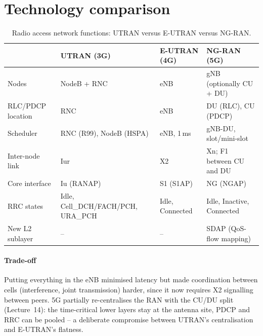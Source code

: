 \documentclass[11pt,a4paper]{article}
\begin{document}
\section{Technology comparison}
\begin{table}[htbp]
\centering\small
\caption{Radio access network functions: UTRAN versus E-UTRAN versus NG-RAN.}\label{tab:ran}
\begin{tabularx}{\linewidth}{@{}l Y Y Y@{}}
\toprule
{} & UTRAN (3G) & E-UTRAN (4G) & NG-RAN (5G) \\
\midrule
Nodes              & NodeB + RNC          & eNB                       & gNB (optionally CU + DU) \\
RLC/PDCP location  & RNC                  & eNB                       & DU (RLC), CU (PDCP) \\
Scheduler          & RNC (R99), NodeB (HSPA) & eNB, 1\,ms             & gNB-DU, slot/mini-slot \\
Inter-node link    & Iur                  & X2                        & Xn; F1 between CU and DU \\
Core interface     & Iu (RANAP)           & S1 (S1AP)                 & NG (NGAP) \\
RRC states         & Idle, Cell\_DCH/FACH/PCH, URA\_PCH & Idle, Connected & Idle, Inactive, Connected \\
New L2 sublayer    & --                   & --                        & SDAP (QoS-flow mapping) \\
\bottomrule
\end{tabularx}
\end{table}

\paragraph{Trade-off} Putting everything in the eNB minimised latency but made coordination between
cells (interference, joint transmission) harder, since it now requires X2 signalling between peers.
5G partially re-centralises the RAN with the CU/DU split (Lecture~14): the time-critical lower layers
stay at the antenna site, PDCP and RRC can be pooled -- a deliberate compromise between UTRAN's
centralisation and E-UTRAN's flatness.

\end{document}
